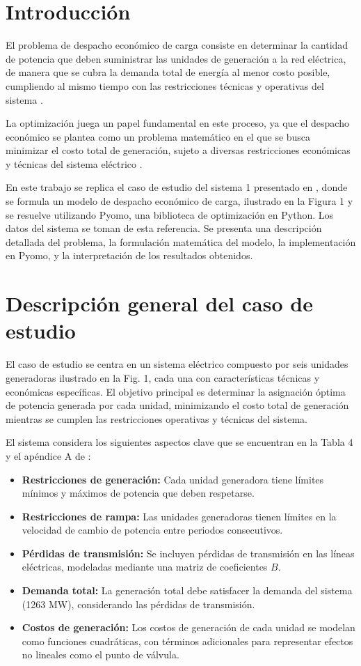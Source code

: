 \documentclass[11pt]{article}
\begin{document}
\section{Introducción}	
El problema de despacho económico de carga consiste en determinar la cantidad de potencia que deben suministrar las unidades de generación a la red eléctrica, de manera que se cubra la demanda total de energía al menor costo posible, cumpliendo al mismo tiempo con las restricciones técnicas y operativas del sistema \citep{en17030550}.

La optimización juega un papel fundamental en este proceso, ya que el despacho económico se plantea como un problema matemático en el que se busca minimizar el costo total de generación, sujeto a diversas restricciones económicas y técnicas del sistema eléctrico \citep{osti_6202356}.

En este trabajo se replica el caso de estudio del sistema 1 presentado en \citep{electronics9010108}, donde se formula un modelo de despacho económico de carga, ilustrado en la Figura 1 y se resuelve utilizando Pyomo, una biblioteca de optimización en Python. Los datos del sistema se toman de esta referencia. Se presenta una descripción detallada del problema, la formulación matemática del modelo, la implementación en Pyomo, y la interpretación de los resultados obtenidos.

\newpage
\section{Descripción general del caso de estudio}

El caso de estudio se centra en un sistema eléctrico compuesto por seis unidades generadoras ilustrado en la Fig. 1, cada una con características técnicas y económicas específicas. El objetivo principal es determinar la asignación óptima de potencia generada por cada unidad, minimizando el costo total de generación mientras se cumplen las restricciones operativas y técnicas del sistema.

El sistema considera los siguientes aspectos clave que se encuentran en la Tabla 4 y el apéndice A de \citep{electronics9010108}:
\begin{itemize}
    \item \textbf{Restricciones de generación:} Cada unidad generadora tiene límites mínimos y máximos de potencia que deben respetarse.
    \item \textbf{Restricciones de rampa:} Las unidades generadoras tienen límites en la velocidad de cambio de potencia entre periodos consecutivos.
    \item \textbf{Pérdidas de transmisión:} Se incluyen pérdidas de transmisión en las líneas eléctricas, modeladas mediante una matriz de coeficientes \( B \).
    \item \textbf{Demanda total:} La generación total debe satisfacer la demanda del sistema (1263 MW), considerando las pérdidas de transmisión.
    \item \textbf{Costos de generación:} Los costos de generación de cada unidad se modelan como funciones cuadráticas, con términos adicionales para representar efectos no lineales como el punto de válvula.
\end{itemize}
\end{document}
